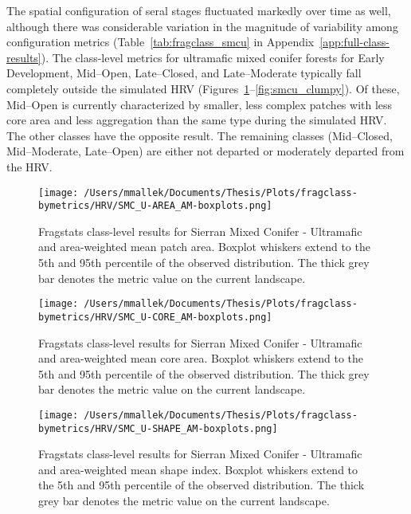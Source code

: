 The spatial configuration of seral stages fluctuated markedly over time as well, although there was considerable variation in the magnitude of variability among configuration metrics (Table~\ref{tab:fragclass_smcu} in Appendix~\ref{app:full-class-results}). The class-level metrics for ultramafic mixed conifer forests for Early Development, Mid--Open, Late--Closed, and Late--Moderate typically fall completely outside the simulated HRV (Figures~\ref{fig:smcu_areaam}--\ref{fig:smcu_clumpy}). Of these, Mid--Open is currently characterized by smaller, less complex patches with less core area and less aggregation than the same type during the simulated HRV. The other classes have the opposite result. The remaining classes (Mid--Closed, Mid--Moderate, Late--Open) are either not departed or moderately departed from the HRV.


\begin{figure}[!htbp]
\centering
    \texttt{[image: /Users/mmallek/Documents/Thesis/Plots/fragclass-bymetrics/HRV/SMC\_U-AREA\_AM-boxplots.png]}
  \caption{Fragstats class-level results for Sierran Mixed Conifer - Ultramafic and area-weighted mean patch area. Boxplot whiskers extend to the 5th and 95th percentile of the observed distribution. The thick grey bar denotes the metric value on the current landscape.}
  \label{fig:smcu_areaam}
\end{figure}


\begin{figure}[!htbp]
\centering
    \texttt{[image: /Users/mmallek/Documents/Thesis/Plots/fragclass-bymetrics/HRV/SMC\_U-CORE\_AM-boxplots.png]}
  \caption{Fragstats class-level results for Sierran Mixed Conifer - Ultramafic and area-weighted mean core area. Boxplot whiskers extend to the 5th and 95th percentile of the observed distribution. The thick grey bar denotes the metric value on the current landscape.}
  \label{fig:smcu_coream}
\end{figure}


\begin{figure}[!htbp]
\centering
    \texttt{[image: /Users/mmallek/Documents/Thesis/Plots/fragclass-bymetrics/HRV/SMC\_U-SHAPE\_AM-boxplots.png]}
  \caption{Fragstats class-level results for Sierran Mixed Conifer - Ultramafic and area-weighted mean shape index. Boxplot whiskers extend to the 5th and 95th percentile of the observed distribution. The thick grey bar denotes the metric value on the current landscape.}
  \label{fig:smcu_shapeam}
\end{figure}


